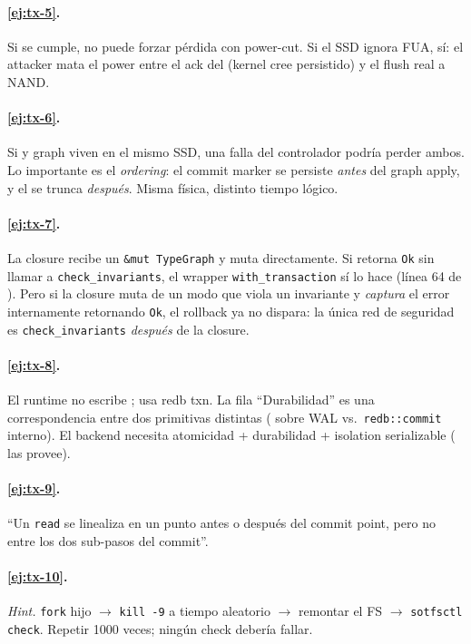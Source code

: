 \paragraph{\ref{ej:tx-5}.} Si  se cumple, no
puede forzar pérdida con power-cut. Si el SSD ignora FUA, sí: el
attacker mata el power entre el ack del \fsync{} (kernel cree
persistido) y el flush real a NAND.

\paragraph{\ref{ej:tx-6}.} Si \wal{} y graph viven en el mismo SSD,
una falla del controlador podría perder ambos. Lo importante es el
\emph{ordering}: el commit marker se persiste \emph{antes} del graph
apply, y el \wal{} se trunca \emph{después}. Misma física, distinto
tiempo lógico.

\paragraph{\ref{ej:tx-7}.} La closure recibe un \texttt{\&mut TypeGraph}
y muta directamente. Si retorna \texttt{Ok} sin llamar a
\texttt{check\_invariants}, el wrapper \texttt{with\_transaction} sí lo
hace (línea 64 de ). Pero si la closure muta de un
modo que viola un invariante y \emph{captura} el error internamente
retornando \texttt{Ok}, el rollback ya no dispara: la única red de
seguridad es \texttt{check\_invariants} \emph{después} de la closure.

\paragraph{\ref{ej:tx-8}.} El runtime no escribe \wal{}; usa redb txn.
La fila ``Durabilidad'' es una correspondencia entre dos primitivas
distintas (\fsync{} sobre WAL vs.\ \texttt{redb::commit} interno). El
backend necesita atomicidad + durabilidad + isolation serializable
(\redb{} las provee).

\paragraph{\ref{ej:tx-9}.} ``Un \texttt{read} se linealiza en un punto
antes o después del commit point, pero no entre los dos
sub-pasos del commit''.

\paragraph{\ref{ej:tx-10}.} \emph{Hint.} \texttt{fork} hijo $\to$
\texttt{kill -9} a tiempo aleatorio $\to$ remontar el FS $\to$
\texttt{sotfsctl check}. Repetir 1000 veces; ningún check debería fallar.


